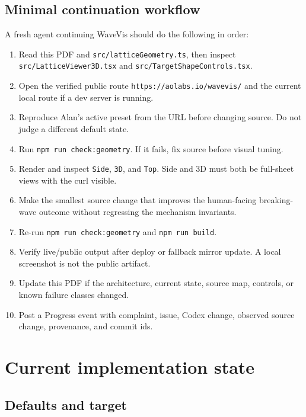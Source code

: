 \documentclass[12pt,letterpaper]{article}
\newcommand{\code}[1]{\texttt{#1}}
\begin{document}
\subsection{Minimal continuation workflow}

A fresh agent continuing WaveVis should do the following in order:
\begin{enumerate}
  \item Read this PDF and \code{src/latticeGeometry.ts}, then inspect \code{src/LatticeViewer3D.tsx} and \code{src/TargetShapeControls.tsx}.
  \item Open the verified public route \code{https://aolabs.io/wavevis/} and the current local route if a dev server is running.
  \item Reproduce Alan's active preset from the URL before changing source. Do not judge a different default state.
  \item Run \code{npm run check:geometry}. If it fails, fix source before visual tuning.
  \item Render and inspect \code{Side}, \code{3D}, and \code{Top}. Side and 3D must both be full-sheet views with the curl visible.
  \item Make the smallest source change that improves the human-facing breaking-wave outcome without regressing the mechanism invariants.
  \item Re-run \code{npm run check:geometry} and \code{npm run build}.
  \item Verify live/public output after deploy or fallback mirror update. A local screenshot is not the public artifact.
  \item Update this PDF if the architecture, current state, source map, controls, or known failure classes changed.
  \item Post a Progress event with complaint, issue, Codex change, observed source change, provenance, and commit ids.
\end{enumerate}

\section{Current implementation state}

\subsection{Defaults and target}
\end{document}
